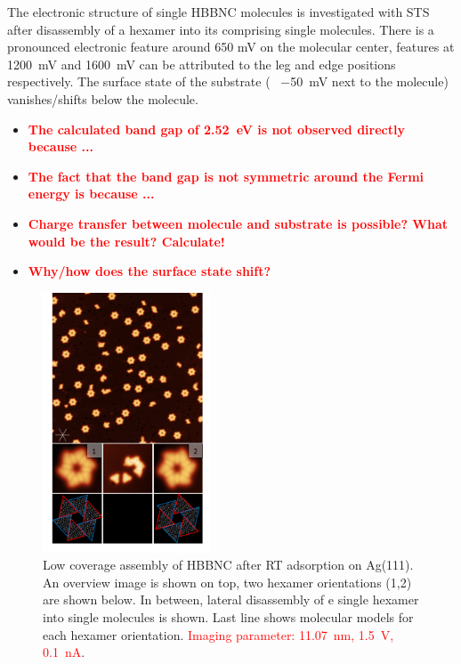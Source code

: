 The electronic structure of single HBBNC molecules is investigated with STS after disassembly of a hexamer into its comprising single molecules. There is a pronounced electronic feature around 650 mV on the molecular center, features at \SI{1200}{\milli \volt} and \SI{1600}{\milli \volt} can be attributed to the leg and edge positions respectively. The surface state of the substrate (~ \SI{-50}{\milli \volt} next to the molecule) vanishes/shifts below the molecule. 
\begin{itemize}
	\item \textbf{\textcolor{red}{The calculated band gap of \SI{2.52}{\eV} is not observed directly because ...}}
	\item \textbf{\textcolor{red}{The fact that the band gap is not symmetric around the Fermi energy is because ...}}
	\item \textbf{\textcolor{red}{Charge transfer between molecule and substrate is possible? What would be the result? Calculate!}}
	\item \textbf{\textcolor{red}{Why/how does the surface state shift?}}
\end{itemize}
\begin{figure}\centering
	\includegraphics[width=5cm]{./images/hbbnc-ag-111-rt}
	\caption{Low coverage assembly of HBBNC after RT adsorption on Ag(111). An overview image is shown on top, two hexamer orientations (1,2) are shown below. In between, lateral disassembly of e single hexamer into single molecules is shown. Last line shows molecular models for each hexamer orientation. \textcolor{red}{Imaging parameter: \SI{11.07}{\nano \meter}, \SI{1.5}{\volt}, \SI{0.1}{\nano \ampere}}.}
	\label{}
\end{figure}

